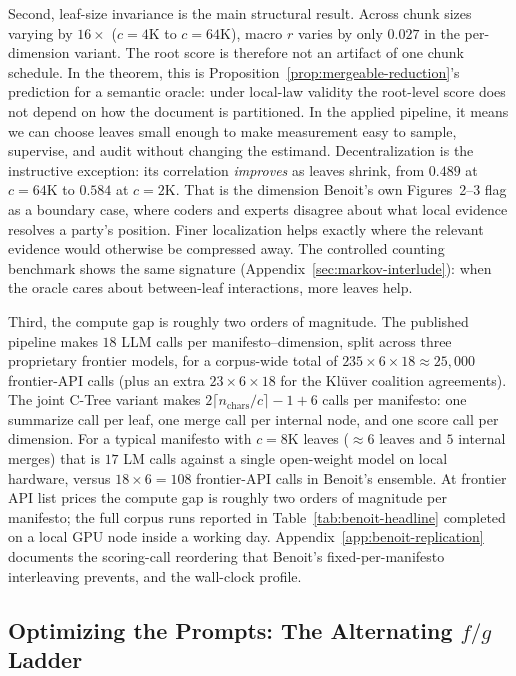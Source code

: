 Second, leaf-size invariance is the main structural result. Across chunk
sizes varying by $16\times$ ($c = 4\mathrm{K}$ to $c = 64\mathrm{K}$),
macro $r$ varies by only $0.027$ in the per-dimension variant. The root
score is therefore not an artifact of one chunk schedule. In the theorem,
this is Proposition~\ref{prop:mergeable-reduction}'s prediction for a
semantic oracle: under local-law validity the root-level score does not
depend on how the document is partitioned. In the applied pipeline, it
means we can choose leaves small enough to make measurement easy to
sample, supervise, and audit without changing the estimand. Decentralization
is the instructive exception: its correlation \emph{improves} as leaves
shrink, from $0.489$ at $c = 64\mathrm{K}$ to $0.584$ at
$c = 2\mathrm{K}$. That is the dimension Benoit's own Figures~2--3 flag
as a boundary case, where coders and experts disagree about what local
evidence resolves a party's position. Finer localization helps exactly
where the relevant evidence would otherwise be compressed away. The
controlled counting benchmark shows the same signature
(Appendix~\ref{sec:markov-interlude}): when the oracle cares about
between-leaf interactions, more leaves help.

Third, the compute gap is roughly two orders of magnitude. The published \citet{BenoitEtAl2025} pipeline makes $18$ LLM calls per
manifesto--dimension, split across three proprietary frontier models,
for a corpus-wide total of $235 \times 6 \times 18 \approx 25{,}000$
frontier-API calls (plus an extra $23 \times 6 \times 18$ for the
Kl\"uver coalition agreements). The joint C-Tree variant makes
$2\lceil n_{\text{chars}}/c\rceil - 1 + 6$ calls per manifesto: one
summarize call per leaf, one merge call per internal node, and one
score call per dimension. For a typical manifesto with $c = 8\mathrm{K}$
leaves ($\approx 6$ leaves and $5$ internal merges) that is $17$ LM
calls against a single open-weight model on local hardware, versus
$18 \times 6 = 108$ frontier-API calls in Benoit's ensemble. At frontier
API list prices the compute gap is roughly two orders of magnitude per
manifesto; the full corpus runs reported in
Table~\ref{tab:benoit-headline} completed on a local GPU node inside a
working day. Appendix~\ref{app:benoit-replication} documents the
scoring-call reordering that Benoit's fixed-per-manifesto interleaving
prevents, and the wall-clock profile.

\subsection[Optimizing the Prompts: The Alternating f/g Ladder]{Optimizing the Prompts: The Alternating $f/g$ Ladder}\label{sec:rile-fg-ladder}

